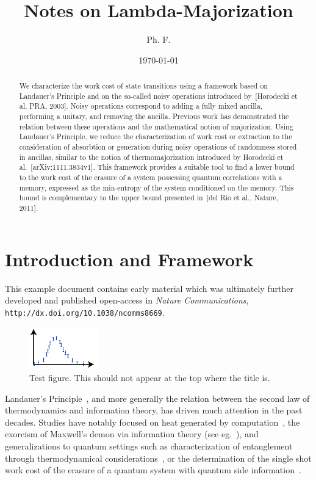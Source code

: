 \documentclass[11pt,a4paper]{article}
\title{Notes on Lambda-Majorization}
\author{Ph. F.}
\date{\today}
\providecommand\url\texttt
\def\noteabstracttextfont{\small\itshape}
\begin{document}
\maketitle

\begin{abstract}
  We characterize the work cost of state transitions using a framework based on Landauer's Principle and
  on the so-called noisy operations introduced by~[Horodecki et al, PRA, 2003]. Noisy operations correspond to
  adding a fully mixed ancilla, performing a unitary, and removing the ancilla. Previous work has demonstrated
  the relation between these operations and the mathematical notion of majorization. Using Landauer's Principle,
  we reduce the characterization of work cost or extraction to the consideration of absorbtion or generation
  during noisy operations of randomness stored in ancillas, similar to the notion of thermomajorization introduced
  by Horodecki et al.~[arXiv:1111.3834v1]. This framework provides a
  suitable tool to find a lower bound to the work cost of the erasure of a system possessing quantum
  correlations with a memory, expressed as the min-entropy of the system conditioned on the memory. This
  bound is complementary to the upper bound presented in~[del Rio et al., Nature, 2011].
\end{abstract}


\inlinetoc

\section{Introduction and Framework}

This example document contains early material which was ultimately further developed and
published open-access in \emph{Nature Communications},
\url{http://dx.doi.org/10.1038/ncomms8669}.

\begin{figure}[t]
  \centering
  \includegraphics[width=3cm]{testfigure}
  \caption{Test figure. This should not appear at the top where the title is.}
  \label{fig:test}
\end{figure}

Landauer's Principle~\cite{Landauer1961_5392446Erasure}, and more generally the relation between the second law
of thermodynamics and information theory, has driven much attention in the past decades. Studies have notably
focused on heat generated by computation~\cite{Bennett1982IJTP_ThermodynOfComp}, the exorcism of Maxwell's demon
via information theory (see eg.~\cite{Bennett2003_NotesLP}), and generalizations to quantum settings such as
characterization of entanglement through thermodynamical
considerations~\cite{Oppenheim2002PRL_thermodynamical}, or the determination of the single shot work cost of
the erasure of a quantum system with quantum side information~\cite{delRio2011Nature}.
\end{document}
